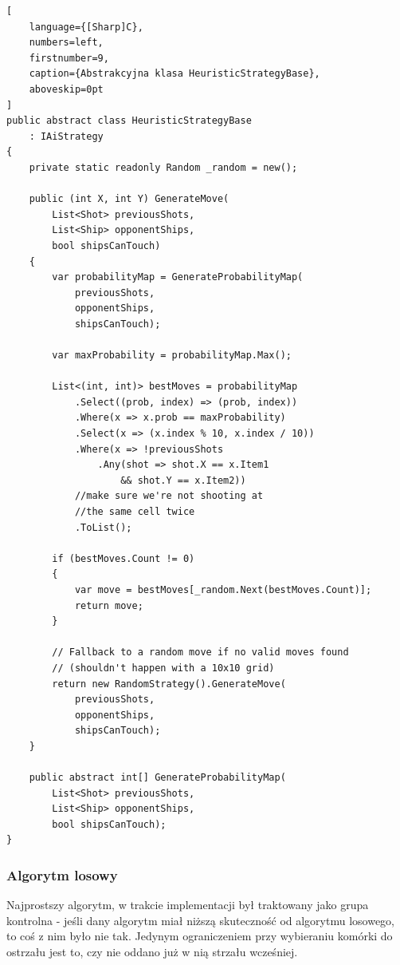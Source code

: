 \begin{addmargin}[10mm]{0mm}
\begin{lstlisting}[
    language={[Sharp]C},
    numbers=left,
    firstnumber=9,
    caption={Abstrakcyjna klasa HeuristicStrategyBase},
    aboveskip=0pt
]
public abstract class HeuristicStrategyBase
    : IAiStrategy
{
    private static readonly Random _random = new();

    public (int X, int Y) GenerateMove(
        List<Shot> previousShots,
        List<Ship> opponentShips,
        bool shipsCanTouch)
    {
        var probabilityMap = GenerateProbabilityMap(
            previousShots,
            opponentShips,
            shipsCanTouch);

        var maxProbability = probabilityMap.Max();

        List<(int, int)> bestMoves = probabilityMap
            .Select((prob, index) => (prob, index))
            .Where(x => x.prob == maxProbability)
            .Select(x => (x.index % 10, x.index / 10))
            .Where(x => !previousShots
                .Any(shot => shot.X == x.Item1
                    && shot.Y == x.Item2))
            //make sure we're not shooting at
            //the same cell twice
            .ToList();

        if (bestMoves.Count != 0)
        {
            var move = bestMoves[_random.Next(bestMoves.Count)];
            return move;
        }

        // Fallback to a random move if no valid moves found
        // (shouldn't happen with a 10x10 grid)
        return new RandomStrategy().GenerateMove(
            previousShots,
            opponentShips,
            shipsCanTouch);
    }

    public abstract int[] GenerateProbabilityMap(
        List<Shot> previousShots,
        List<Ship> opponentShips,
        bool shipsCanTouch);
}
\end{lstlisting}
\end{addmargin}

\subsubsection{Algorytm losowy}
Najprostszy algorytm, w trakcie implementacji był traktowany jako grupa kontrolna - jeśli dany algorytm miał niższą skuteczność od algorytmu losowego, to coś z nim było nie tak. Jedynym ograniczeniem przy wybieraniu komórki do ostrzału jest to, czy nie oddano już w nią strzału wcześniej.

